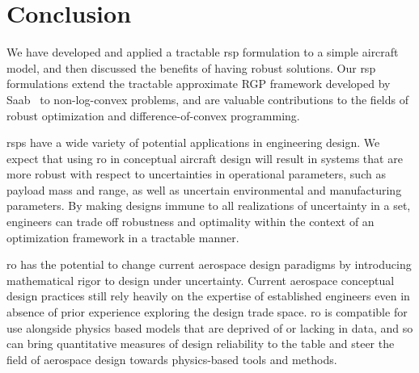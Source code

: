 \section{Conclusion}

We have developed and applied a tractable \gls{rsp} formulation to a simple aircraft model,
and then discussed the benefits of having robust solutions. Our \gls{rsp} formulations extend
the tractable approximate RGP framework developed by Saab~\cite{Saab2018} to non-log-convex problems,
and are valuable contributions to the fields of robust optimization and difference-of-convex programming.

\gls{rsp}s have a wide variety of potential applications in engineering design.
We expect that using \gls{ro} in conceptual aircraft design will result in systems
that are more robust with respect to uncertainties in operational parameters,
such as payload mass and range, as well as uncertain environmental and manufacturing parameters.
By making designs immune to all realizations of uncertainty in a set, engineers can trade off
robustness and optimality within the context of an optimization framework in a tractable manner.

\gls{ro} has
the potential to change current aerospace design paradigms by introducing
mathematical rigor to design under uncertainty. Current aerospace
conceptual design practices still rely heavily on the expertise of established
engineers even in absence of prior experience exploring the design trade space.
\gls{ro} is compatible for use alongside physics based models
that are deprived of or lacking in data, and so can bring quantitative
measures of design reliability to the table and
steer the field of aerospace design towards physics-based tools and methods.


